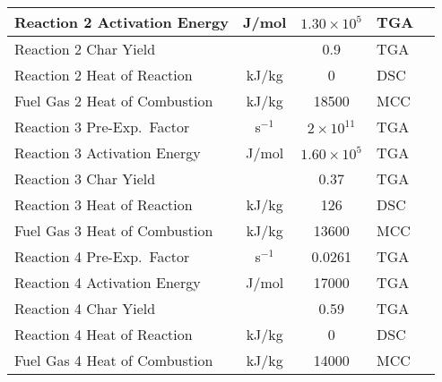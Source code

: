 \begin{longtable}{@{\extracolsep{\fill}}|l|c|c|l|l|}
Reaction 2 Activation Energy	  & J/mol	      & $1.30\times 10^5$                       & TGA	                                    & \cite{McKinnon:CF2013}                \\ \hline
Reaction 2 Char Yield	 	      &               & 0.9	                                    & TGA	                                    & \cite{McKinnon:CF2013}                \\ \hline
Reaction 2 Heat of Reaction       & kJ/kg	      & 0                                       & DSC	                                    & \cite{McKinnon:CF2013}                \\ \hline
Fuel Gas 2 Heat of Combustion     & kJ/kg	      & 18500	                                & MCC	                                    & \cite{McKinnon:CF2013}                \\ \hline
Reaction 3 Pre-Exp.~Factor        & s$^{-1}$	  & $2\times 10^{11}$                   	& TGA                                       & \cite{McKinnon:CF2013}                \\ \hline
Reaction 3 Activation Energy	  & J/mol	      & $1.60\times 10^5$	                    & TGA	                                    & \cite{McKinnon:CF2013}                \\ \hline
Reaction 3 Char Yield	 	      &               & 0.37	                                & TGA	                                    & \cite{McKinnon:CF2013}                \\ \hline
Reaction 3 Heat of Reaction	      & kJ/kg	      & 126                                 	& DSC                                       & \cite{McKinnon:CF2013}                \\ \hline
Fuel Gas 3 Heat of Combustion     & kJ/kg	      & 13600	                                & MCC	                                    & \cite{McKinnon:CF2013}                \\ \hline
Reaction 4 Pre-Exp.~Factor        & s$^{-1}$	  & 0.0261	                                & TGA	                                    & \cite{McKinnon:CF2013}                \\ \hline
Reaction 4 Activation Energy	  & J/mol	      & 17000	                                & TGA                                       & \cite{McKinnon:CF2013}                \\ \hline
Reaction 4 Char Yield	 	      &               & 0.59	                                & TGA                                       & \cite{McKinnon:CF2013}                \\ \hline
Reaction 4 Heat of Reaction	      & kJ/kg	      & 0                                       & DSC	                                    & \cite{McKinnon:CF2013}                \\ \hline
Fuel Gas 4 Heat of Combustion     & kJ/kg	      & 14000                               	& MCC                                       & \cite{McKinnon:CF2013}                \\ \hline
\end{longtable}

